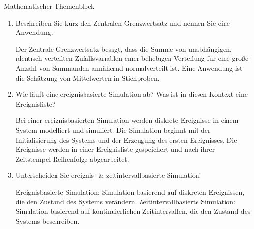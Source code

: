 \documentclass{article}
\begin{document}
\begin{exercise}{Mathematischer Themenblock}
  \begin{enumerate}
    \item Beschreiben Sie kurz den Zentralen Grenzwertsatz und nennen Sie eine Anwendung.
          \begin{solution}
            Der Zentrale Grenzwertsatz besagt, dass die Summe von unabhängigen, identisch verteilten Zufallsvariablen einer beliebigen Verteilung für eine große Anzahl von Summanden annähernd normalverteilt ist. Eine Anwendung ist die Schätzung von Mittelwerten in Stichproben.
          \end{solution}
    \item Wie läuft eine ereignisbasierte Simulation ab? Was ist in diesen Kontext eine Ereignisliste?
          \begin{solution}
            Bei einer ereignisbasierten Simulation werden diskrete Ereignisse in einem System modelliert und simuliert. Die Simulation beginnt mit der Initialisierung des Systems und der Erzeugung des ersten Ereignisses. Die Ereignisse werden in einer Ereignisliste gespeichert und nach ihrer Zeitstempel-Reihenfolge abgearbeitet.
          \end{solution}
    \item Unterscheiden Sie ereignis- \& zeitintervallbasierte Simulation!
          \begin{solution}
            Ereignisbasierte Simulation: Simulation basierend auf diskreten Ereignissen, die den Zustand des Systems verändern. Zeitintervallbasierte Simulation: Simulation basierend auf kontinuierlichen Zeitintervallen, die den Zustand des Systems beschreiben.
          \end{solution}
  \end{enumerate}
\end{exercise}
\end{document}
